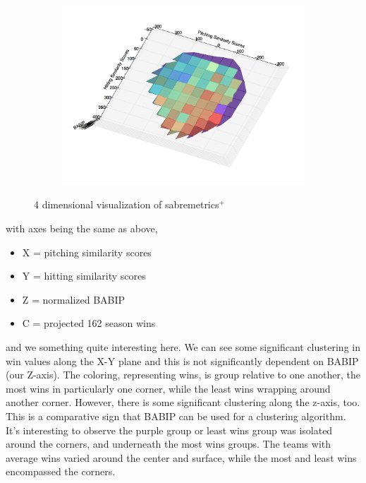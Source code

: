 \documentclass[12pt]{article}
\numberwithin{equation}{subsection}
\begin{document}
\begin{figure}[H]
\begin{subfigure}[b]{0.5\linewidth}
    \label{fig5:c} 
  \end{subfigure}%
  \begin{subfigure}[b]{0.5\linewidth}
    \centering
    \includegraphics[width=0.9\linewidth]{4d4} 
    \label{fig5:d} 
  \end{subfigure} 
  \caption{4 dimensional visualization of sabremetrics$^+$}
  \label{fig5} 
\end{figure}

\noindent with axes being the same as above,
\begin{itemize}
	\item X = pitching similarity scores
    \item Y = hitting similarity scores
    \item Z = normalized BABIP
    \item C = projected 162 season wins
\end{itemize}

and we something quite interesting here. We can see some significant clustering in win values along the X-Y plane and this is not significantly dependent on BABIP (our Z-axis). The coloring, representing wins, is group relative to one another, the most wins in particularly one corner, while the least wins wrapping around another corner. However, there is some significant clustering along the z-axis, too. This is a comparative sign that BABIP can be used for a clustering algorithm. It's interesting to observe the purple group or least wins group was isolated around the corners, and underneath the most wins groups. The teams with average wins varied around the center and surface, while the most and least wins encompassed the corners. \\
\end{document}
